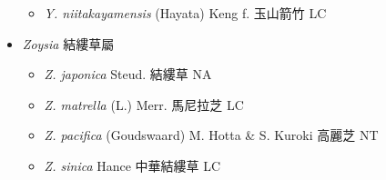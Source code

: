 \begin{itemize}
  \begin{itemize}
        \item[] \textit{Y. niitakayamensis} (Hayata) Keng f.  玉山箭竹   LC
  \end{itemize}
 \item[] \textit{Zoysia} 結縷草屬
                                
  \begin{itemize}
        \item[] \textit{Z. japonica} Steud.  結縷草   NA
        \item[] \textit{Z. matrella} (L.) Merr.  馬尼拉芝   LC
        \item[] \textit{Z. pacifica} (Goudswaard) M. Hotta \& S. Kuroki  高麗芝   NT
        \item[] \textit{Z. sinica} Hance  中華結縷草   LC
  \end{itemize}
  \end{itemize}
